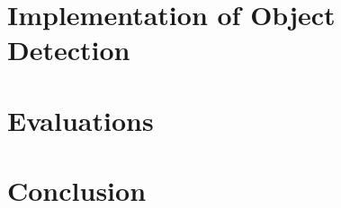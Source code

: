 \part{Implementation of Object Detection}




\part{Evaluations} %

 


\part{Conclusion}
%





\appendix                       %






\listoftables
\listoffigures
\lstlistoflistings
\nocite{*} %



